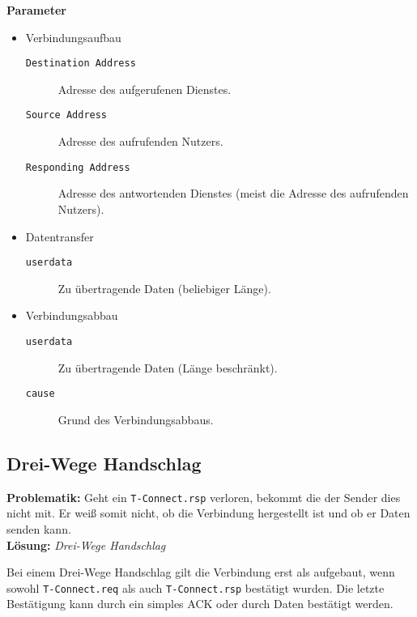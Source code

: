             \textbf{Parameter}
            \begin{itemize}
            	\item Verbindungsaufbau
	            	\begin{description}
	            		\item[\texttt{Destination Address}] Adresse des aufgerufenen Dienstes.
	            		\item[\texttt{Source Address}] Adresse des aufrufenden Nutzers.
	            		\item[\texttt{Responding Address}] Adresse des antwortenden Dienstes (meist die Adresse des aufrufenden Nutzers).
	            	\end{description}
            	\item Datentransfer
	            	\begin{description}
	            		\item[\texttt{userdata}] Zu übertragende Daten (beliebiger Länge).
            		\end{description}
            	\item Verbindungsabbau
	            	\begin{description}
	            		\item[\texttt{userdata}] Zu übertragende Daten (Länge beschränkt).
	            		\item[\texttt{cause}] Grund des Verbindungsabbaus.
            		\end{description}
            \end{itemize}

        \subsection{Drei-Wege Handschlag} %
            \textbf{Problematik:} Geht ein \texttt{T-Connect.rsp} verloren, bekommt die der Sender dies nicht mit. Er weiß somit nicht, ob die Verbindung hergestellt ist und ob er Daten senden kann. \\
            \textbf{Lösung:} \textit{Drei-Wege Handschlag}
            
            Bei einem Drei-Wege Handschlag gilt die Verbindung erst als aufgebaut, wenn sowohl \texttt{T-Connect.req} als auch \texttt{T-Connect.rsp} bestätigt wurden. Die letzte Bestätigung kann durch ein simples ACK oder durch Daten bestätigt werden.
            
